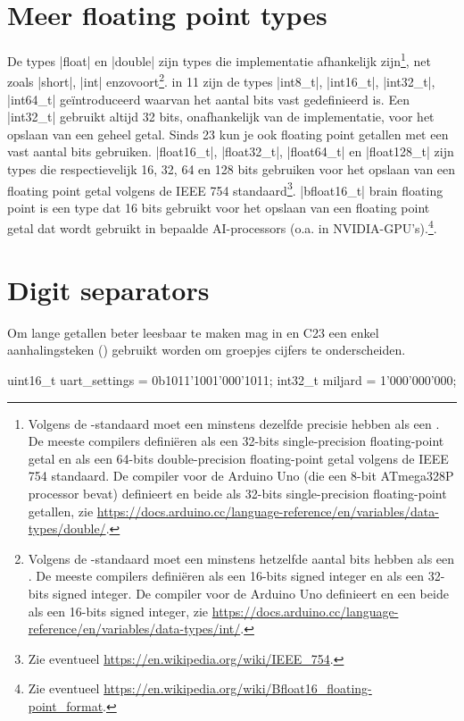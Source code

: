 \begin{cpplstShortInline}
\section{Meer floating point types}
De types |float| en |double| zijn types die implementatie afhankelijk zijn\footnote{%
	Volgens de \Cpp{}-standaard moet een  minstens dezelfde precisie hebben als een .
	De meeste compilers definiëren  als een 32-bits single-precision floating-point getal en  als een 64-bits double-precision floating-point getal volgens de IEEE 754 standaard.
	De compiler voor de Arduino Uno (die een 8-bit ATmega328P processor bevat) definieert  en  beide als 32-bits single-precision floating-point getallen, zie \url{https://docs.arduino.cc/language-reference/en/variables/data-types/double/}.
}, net zoals |short|, |int| enzovoort\footnote{%
	Volgens de \Cpp{}-standaard moet een  minstens hetzelfde aantal bits hebben als een .
	De meeste compilers definiëren  als een 16-bits signed integer en  als een 32-bits signed integer.
	De compiler voor de Arduino Uno definieert  en een  beide als een 16-bits signed integer, zie \url{https://docs.arduino.cc/language-reference/en/variables/data-types/int/}.
}.
in \Cpp{}11 zijn de types |int8_t|, |int16_t|, |int32_t|, |int64_t| geïntroduceerd waarvan het aantal bits vast gedefinieerd is.
Een |int32_t| gebruikt altijd 32 bits, onafhankelijk van de implementatie, voor het opslaan van een geheel getal.
Sinds \Cpp{}23 kun je ook floating point getallen met een vast aantal bits gebruiken.
|float16_t|, |float32_t|, |float64_t| en |float128_t| zijn types die respectievelijk 16, 32, 64 en 128 bits gebruiken voor het opslaan van een floating point getal volgens de IEEE 754 standaard\footnote{%
	Zie eventueel \url{https://en.wikipedia.org/wiki/IEEE_754}.
}.
|bfloat16_t| brain floating point is een type dat 16 bits gebruikt voor het opslaan van een floating point getal dat wordt gebruikt in bepaalde AI-processors (o.a. in NVIDIA-GPU's).\footnote{%
	Zie eventueel \url{https://en.wikipedia.org/wiki/Bfloat16_floating-point_format}.
}.

\section{Digit separators}
\label{sec:digitseparators}
Om lange getallen beter leesbaar te maken mag in \Cpp{} en C23 \cite{ISO2023C} een enkel aanhalingsteken () gebruikt worden om groepjes cijfers te onderscheiden.
\begin{lstfragment}
	uint16_t uart_settings = 0b1011'1001'000'1011;
	int32_t miljard = 1'000'000'000; 
\end{lstfragment}


\end{cpplstShortInline}
